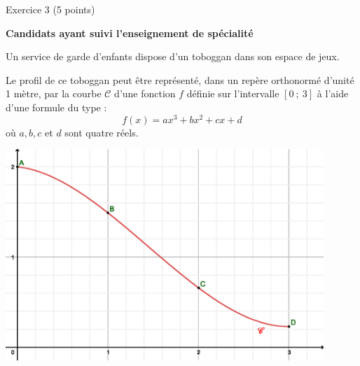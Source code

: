 
%
\begin{h2}Exercice 3 (5 points)\end{h2}
\par      
\textbf{Candidats ayant suivi l'enseignement de spécialité}
\par
%
%
\par
Un service de garde d'enfants dispose d'un toboggan dans son espace de jeux.
\par
Le profil de ce toboggan peut être représenté, dans un repère orthonormé d'unité 1 mètre, par la courbe $\mathscr{C}$ d'une fonction $f$ définie sur l'intervalle $[0~;~3]$ à l'aide d'une formule du type :
\[ f(x)=ax^3+bx^2+cx+d \]
où $a, b, c$ et $d$ sont quatre réels.
\par
\begin{center}
     \begin{extern}%
          \includegraphics[width=0.9\textwidth]{images/BBESL-spe-4-1}%
     \end{extern}
\end{center}

